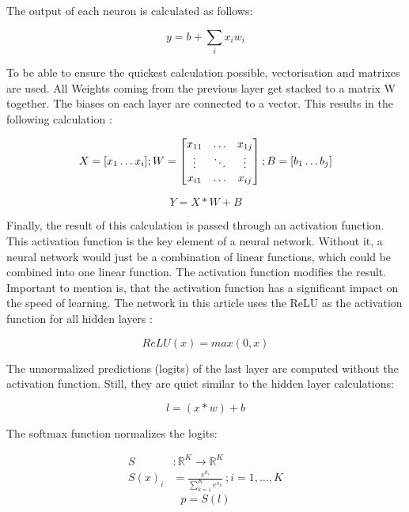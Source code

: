 The output of each neuron is calculated as follows: \cite{medium_nn_from_scratch}

\begin{equation}
y = b + \sum_{i} x_i w_i
\end{equation}

To be able to ensure the quickest calculation possible, vectorisation and matrixes are used.
All Weights coming from the previous layer get stacked to a matrix W together.
The biases on each layer are connected to a vector.
This results in the following calculation
: \cite{medium_nn_from_scratch}

\begin{equation}
X = [ x_1 \dots x_i ]; \space W = 
\begin{bmatrix}
    x_{11} & \dots  & x_{1j} \\
    \vdots & \ddots & \vdots \\
    x_{i1} & \dots  & x_{ij}
\end{bmatrix}; \space
B = [ b_1 \dots b_j ]
\end{equation}

\begin{equation}
    Y = X * W + B
\end{equation}

Finally, the result of this calculation is passed through an activation function.
This activation function is the key element of a neural network.
Without it, a neural network would just be a combination of linear functions, which could be combined into one linear function.
The activation function modifies the result.
Important to mention is, that the activation function has a significant impact on the speed of learning.
The network in this article uses the ReLU as the activation function for all hidden layers \cite{math_nn_skalski,relu}:

\begin{equation}
    ReLU(x) = max(0,x)
\end{equation}

The unnormalized predictions (logits) of the last layer are computed without the activation function.
Still, they are quiet similar to the hidden layer calculations:

$$l = (x*w)+b$$

The softmax function normalizes the logits:

\begin{equation}
    \begin{split}
        S & : \mathbb{R}^K \to \mathbb{R}^K
        \\
        S(x)_i & = \frac{e^{k_i}}{\sum_{k=1}^K e^{x_k}} \: ; i = 1, …, K
    \end{split}
\end{equation}
\begin{equation}
    p = S(l)
\end{equation}

